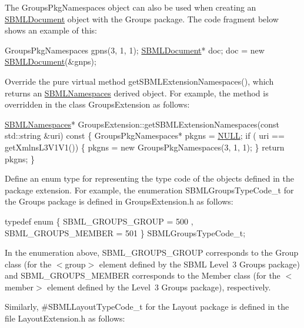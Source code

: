 The {\ttfamily Groups\+Pkg\+Namespaces} object can also be used when creating an \hyperlink{class_s_b_m_l_document}{S\+B\+M\+L\+Document} object with the Groups package. The code fragment below shows an example of this\+: 
\begin{DoxyCode}
GroupsPkgNamespaces gpns(3, 1, 1);
\hyperlink{class_s_b_m_l_document}{SBMLDocument}* doc;
doc  = \textcolor{keyword}{new} \hyperlink{class_s_b_m_l_document}{SBMLDocument}(&gnps);
\end{DoxyCode}


Override the pure virtual method {\ttfamily get\+S\+B\+M\+L\+Extension\+Namespaces()}, which returns an \hyperlink{class_s_b_m_l_namespaces}{S\+B\+M\+L\+Namespaces} derived object. For example, the method is overridden in the class {\ttfamily Groups\+Extension} as follows\+: 
\begin{DoxyCode}
\hyperlink{class_s_b_m_l_namespaces}{SBMLNamespaces}*
GroupsExtension::getSBMLExtensionNamespaces(\textcolor{keyword}{const} std::string &uri)\textcolor{keyword}{ const}
\textcolor{keyword}{}\{
  GroupsPkgNamespaces* pkgns = \hyperlink{lp__types_8h_a070d2ce7b6bb7e5c05602aa8c308d0c4}{NULL};
  \textcolor{keywordflow}{if} ( uri == getXmlnsL3V1V1())
  \{
    pkgns = \textcolor{keyword}{new} GroupsPkgNamespaces(3, 1, 1);
  \}
  \textcolor{keywordflow}{return} pkgns;
\}
\end{DoxyCode}


Define an enum type for representing the type code of the objects defined in the package extension. For example, the enumeration {\ttfamily S\+B\+M\+L\+Groups\+Type\+Code\+\_\+t} for the Groups package is defined in {\ttfamily Groups\+Extension.\+h} as follows\+: 
\begin{DoxyCode}
\textcolor{keyword}{typedef} \textcolor{keyword}{enum}
\{
   SBML\_GROUPS\_GROUP  = 500
 , SBML\_GROUPS\_MEMBER = 501
\} SBMLGroupsTypeCode\_t;
\end{DoxyCode}


In the enumeration above, {\ttfamily S\+B\+M\+L\+\_\+\+G\+R\+O\+U\+P\+S\+\_\+\+G\+R\+O\+UP} corresponds to the {\ttfamily Group} class (for the {\ttfamily $<$group$>$} element defined by the S\+B\+ML Level~3 Groups package) and {\ttfamily S\+B\+M\+L\+\_\+\+G\+R\+O\+U\+P\+S\+\_\+\+M\+E\+M\+B\+ER} corresponds to the {\ttfamily Member} class (for the {\ttfamily $<$member$>$} element defined by the Level~3 Groups package), respectively.

Similarly, \#\+S\+B\+M\+L\+Layout\+Type\+Code\+\_\+t for the Layout package is defined in the file {\ttfamily Layout\+Extension.\+h} as follows\+:


